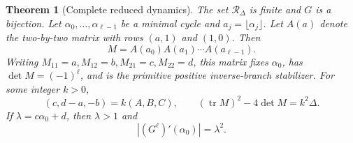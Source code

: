 \documentclass[10pt]{article}
\newtheorem{theorem}{Theorem}
\begin{document}
\begin{theorem}[Complete reduced dynamics]\label{thm:main}
The set \(\mathcal R_\Delta\) is finite and \(G\) is a bijection.  Let
\(\alpha_0,\ldots,\alpha_{\ell-1}\) be a minimal cycle and
\(a_j=\lfloor\alpha_j\rfloor\).  Let \(A(a)\) denote the two-by-two matrix
with rows \((a,1)\) and \((1,0)\).  Then
\begin{equation}\label{eq:matrix}
 M=A(a_0)A(a_1)\cdots A(a_{\ell-1}).
\end{equation}
Writing \(M_{11}=a,M_{12}=b,M_{21}=c,M_{22}=d\), this matrix fixes
\(\alpha_0\), has \(\det M=(-1)^\ell\), and is the primitive positive
inverse-branch stabilizer.  For some integer \(k>0\),
\begin{equation}\label{eq:disc}
 (c,d-a,-b)=k(A,B,C),\qquad
 (\operatorname{tr}M)^2-4\det M=k^2\Delta.
\end{equation}
If \(\lambda=c\alpha_0+d\), then \(\lambda>1\) and
\begin{equation}\label{eq:multiplier}
 \left|(G^\ell)'(\alpha_0)\right|=\lambda^2.
\end{equation}
\end{theorem}
\end{document}
